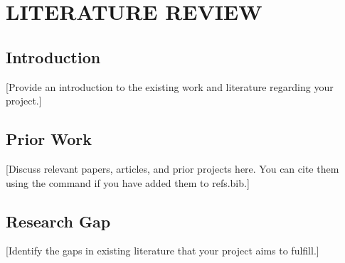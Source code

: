 \chapter{LITERATURE REVIEW}
\label{chap:lit_review}

\section{Introduction}
[Provide an introduction to the existing work and literature regarding your project.]

\section{Prior Work}
[Discuss relevant papers, articles, and prior projects here. You can cite them using the \cite{} command if you have added them to refs.bib.]

\section{Research Gap}
[Identify the gaps in existing literature that your project aims to fulfill.]
